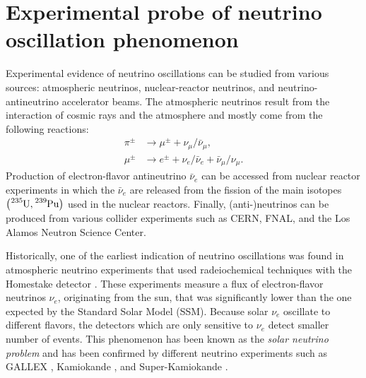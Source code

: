 \documentclass[twocolumn,secnumarabic,amssymb, nobibnotes, aps, prd,10pt]{revtex4-1}
\begin{document}
\section{Experimental probe of neutrino oscillation phenomenon}
\label{sec:experiment}

Experimental evidence of neutrino oscillations can be studied from various sources:
atmospheric neutrinos, nuclear-reactor neutrinos, and neutrino-antineutrino accelerator
beams. The atmospheric neutrinos result from the interaction of cosmic rays and the
atmosphere and mostly come from the following reactions:
\begin{align}
\pi^\pm  &\longrightarrow \mu^\pm + \nu_\mu / \bar{\nu}_\mu, \\
\mu^\pm  &\longrightarrow e^\pm + \nu_e / \bar{\nu}_e + \bar{\nu}_\mu / \nu_\mu .
\end{align}
Production of electron-flavor antineutrino $\bar{\nu}_e$ can be accessed from nuclear
reactor experiments in which the $\bar{\nu}_e$ are released from the fission of the 
main isotopes $\left( \ce{^{235}U}, \ce{^{239}Pu} \right)$ used in the nuclear reactors.
Finally, (anti-)neutrinos can be produced from various collider experiments such as
CERN, FNAL, and the Los Alamos Neutron Science Center.

Historically, one of the earliest indication of neutrino oscillations was found in 
atmospheric neutrino experiments that used radeiochemical techniques with the Homestake
detector \cite{Cleveland:1998nv}. These experiments measure a flux of electron-flavor 
neutrinos $\nu_e$, originating from the sun, that was significantly lower than the 
one expected by the Standard Solar Model (SSM). Because solar $\nu_e$ oscillate to 
different flavors, the detectors which are only sensitive to $\nu_e$ detect smaller 
number of events. This phenomenon has been known as the \emph{solar neutrino problem} 
and has been confirmed by different neutrino experiments such as GALLEX 
\cite{Hampel:1996qd, Anselmann:1993mh}, Kamiokande \cite{Hirata:1988ad, Hirata:1991ub, 
Fukuda:1996sz}, and Super-Kamiokande \cite{Fukuda:1998fd, Giunti:1999qm}.
\end{document}
